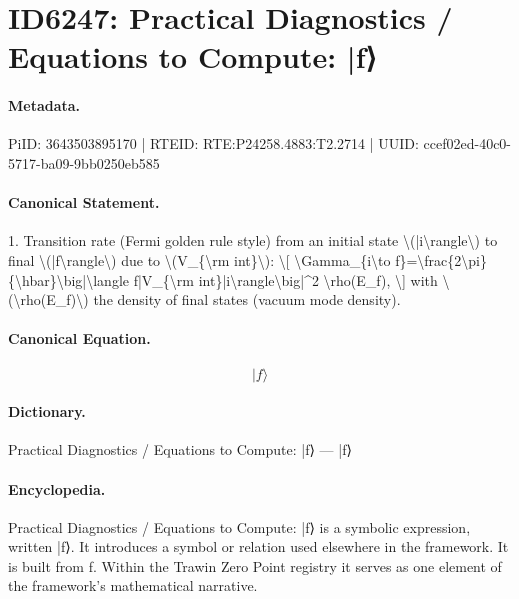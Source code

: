 \section*{ID6247: Practical Diagnostics / Equations to Compute: |f⟩}
\paragraph{Metadata.}
PiID: 3643503895170 | RTEID: RTE:P24258.4883:T2.2714 | UUID: ccef02ed-40c0-5717-ba09-9bb0250eb585

\paragraph{Canonical Statement.}
1. Transition rate (Fermi golden rule style) from an initial state \textbackslash{}(|i\textbackslash{}rangle\textbackslash{}) to final \textbackslash{}(|f\textbackslash{}rangle\textbackslash{}) due to \textbackslash{}(V\_\{\textbackslash{}rm int\}\textbackslash{}): \textbackslash{}[ \textbackslash{}Gamma\_\{i\textbackslash{}to f\}=\textbackslash{}frac\{2\textbackslash{}pi\}\{\textbackslash{}hbar\}\textbackslash{}big|\textbackslash{}langle f|V\_\{\textbackslash{}rm int\}|i\textbackslash{}rangle\textbackslash{}big|\textasciicircum{}2 \textbackslash{}rho(E\_f), \textbackslash{}] with \textbackslash{}(\textbackslash{}rho(E\_f)\textbackslash{}) the density of final states (vacuum mode density).

\paragraph{Canonical Equation.}
\[
|f\rangle
\]

\paragraph{Dictionary.}
Practical Diagnostics / Equations to Compute: |f⟩ — |f⟩

\paragraph{Encyclopedia.}
Practical Diagnostics / Equations to Compute: |f⟩ is a symbolic expression, written |f⟩. It introduces a symbol or relation used elsewhere in the framework. It is built from f. Within the Trawin Zero Point registry it serves as one element of the framework's mathematical narrative.
